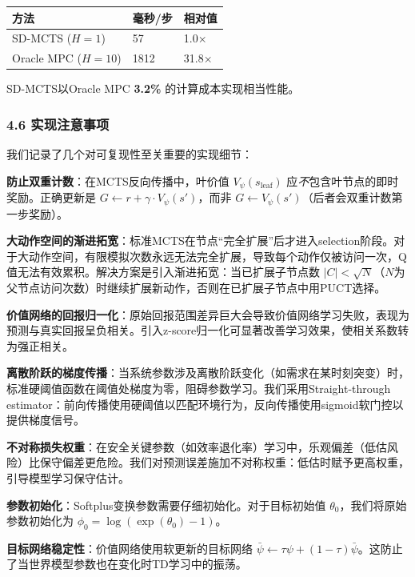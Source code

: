 \documentclass[UTF8]{ctexart}
\begin{document}
\begin{table}[h]
\centering
\begin{tabular}{p{4cm}p{4cm}p{4cm}}
\toprule
\textbf{方法} & \textbf{毫秒/步} & \textbf{相对值} \\
\midrule
SD-MCTS (\(H=1\)) & 57 & 1.0× \\
Oracle MPC (\(H=10\)) & 1812 & 31.8× \\
\bottomrule
\end{tabular}
\end{table}

SD-MCTS以Oracle MPC \textbf{3.2\%} 的计算成本实现相当性能。

\hypertarget{ux5b9eux73b0ux6ce8ux610fux4e8bux9879}{%
\subsubsection{4.6
实现注意事项}\label{ux5b9eux73b0ux6ce8ux610fux4e8bux9879}}

我们记录了几个对可复现性至关重要的实现细节：

\textbf{防止双重计数}：在MCTS反向传播中，叶价值
\(V_\psi(s_{\text{leaf}})\) 应\emph{不}包含叶节点的即时奖励。正确更新是
\(G \leftarrow r + \gamma \cdot V_\psi(s')\)，而非
\(G \leftarrow V_\psi(s')\)（后者会双重计数第一步奖励）。

\textbf{大动作空间的渐进拓宽}：标准MCTS在节点``完全扩展''后才进入selection阶段。对于大动作空间，有限模拟次数永远无法完全扩展，导致每个动作仅被访问一次，Q值无法有效累积。解决方案是引入渐进拓宽：当已扩展子节点数
\(|C| < \sqrt{N}\)（\(N\)为父节点访问次数）时继续扩展新动作，否则在已扩展子节点中用PUCT选择。

\textbf{价值网络的回报归一化}：原始回报范围差异巨大会导致价值网络学习失败，表现为预测与真实回报呈负相关。引入z-score归一化可显著改善学习效果，使相关系数转为强正相关。

\textbf{离散阶跃的梯度传播}：当系统参数涉及离散阶跃变化（如需求在某时刻突变）时，标准硬阈值函数在阈值处梯度为零，阻碍参数学习。我们采用Straight-through
estimator：前向传播使用硬阈值以匹配环境行为，反向传播使用sigmoid软门控以提供梯度信号。

\textbf{不对称损失权重}：在安全关键参数（如效率退化率）学习中，乐观偏差（低估风险）比保守偏差更危险。我们对预测误差施加不对称权重：低估时赋予更高权重，引导模型学习保守估计。

\textbf{参数初始化}：Softplus变换参数需要仔细初始化。对于目标初始值
\(\theta_0\)，我们将原始参数初始化为
\(\phi_0 = \log(\exp(\theta_0) - 1)\)。

\textbf{目标网络稳定性}：价值网络使用软更新的目标网络
\(\bar{\psi} \leftarrow \tau \psi + (1-\tau) \bar{\psi}\)。这防止了当世界模型参数也在变化时TD学习中的振荡。
\end{document}
